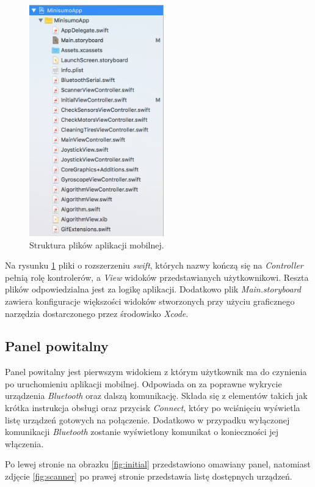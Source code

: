 \begin{figure}[H]
	\centering
		\includegraphics[width=0.75\linewidth, height=10cm, keepaspectratio]{pic05/structure.png}
	\caption{Struktura plików aplikacji mobilnej.}
	\label{fig:structure}	
\end{figure}

Na rysunku \ref{fig:structure} pliki o rozszerzeniu \textit{swift}, których nazwy kończą się na \textit{Controller} pełnią rolę kontrolerów, a \textit{View} widoków przedstawianych użytkownikowi. Reszta plików odpowiedzialna jest za logikę aplikacji. Dodatkowo plik \textit{Main.storyboard} zawiera konfiguracje większości widoków stworzonych przy użyciu graficznego narzędzia dostarczonego przez środowisko \textit{Xcode}.

\subsection{Panel powitalny}
Panel powitalny jest pierwszym widokiem z którym użytkownik ma do czynienia po uruchomieniu aplikacji mobilnej. Odpowiada on za poprawne wykrycie urządzenia \textit{Bluetooth} oraz dalszą komunikację. Składa się z elementów takich jak krótka instrukcja obsługi oraz przycisk \textit{Connect}, który po wciśnięciu wyświetla listę urządzeń gotowych na połączenie. Dodatkowo w przypadku wyłączonej komunikacji \textit{Bluetooth} zostanie wyświetlony komunikat o konieczności jej włączenia. 

\newpage

Po lewej stronie na obrazku \ref{fig:initial} przedstawiono omawiany panel, natomiast zdjęcie \ref{fig:scanner} po prawej stronie przedstawia listę dostępnych urządzeń.

